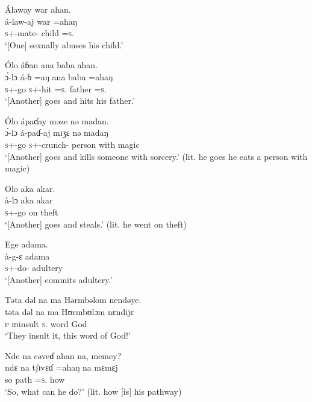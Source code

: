 \ea Álaway  war  ahan.\\
 \gll á-law-aj      war   =ahaŋ\\
 \textsc{s}+{\IFV}-mate{}-{\CL}  child  =\textsc{s}.{\POSS}\\
 \glt ‘[One] sexually abuses his child.’
 \z

\ea  Ólo  áɓan  ana  baba  ahan.\\ 
 \gll \'ɔ-lɔ     á-ɓ    =aŋ   ana  baba  =ahaŋ\\
 \textsc{s}+{\IFV}-go  \textsc{s}+{\IFV}-hit  =\textsc{s}.{\IO}  {\DAT}       father    =\textsc{s}.{\POSS}\\
 \glt ‘[Another] goes and hits his father.’ 
 \z

\ea Ólo  ápaɗay  məze  nə  madan. \\
 \gll \'ɔ{}-lɔ     á-paɗ-aj       mɪʒɛ   nə   madaŋ\\
 \textsc{s}+{\IFV}-go  \textsc{s}+{\IFV}-crunch{}-{\CL}  person  with  magic  \\
 \glt ‘[Another] goes and kills someone with sorcery.’ (lit. he goes he eats a person with magic)
 \z

\ea Olo  aka  akar.\\
 \gll à-lɔ         aka   akar\\
 \textsc{s}+{\PFV}-go   on  theft  \\
 \glt ‘[Another] goes and steals.’ (lit. he went on theft)
 \z

\ea Ege  adama.\\
 \gll à-g-ɛ     adama\\
 \textsc{s}+{\PFV}-do-{\CL}  adultery\\
 \glt ‘[Another] commits adultery.’ 
 \z

\ea Təta  dəl  na  ma  Hərmbəlom  nendəye.\\
 \gll təta   dəl     na   ma   Hʊrmbʊlɔm   nɛndijɛ\\
 \textsc{p}    \textsc{id}insult    \textsc{s}.{\DO}  word  God    {\DEM}\\
 \glt ‘They insult it, this word of God!’
 \z

\ea Nde na  cəveɗ  ahan  na,  memey?\\
 \gll ndɛ  na   tʃɪvɛɗ =ahaŋ     na   mɛmɛj\\
 so  {\PSP}  path  =\textsc{s}.{\POSS}  {\PSP}  how\\
 \glt ‘So, what can he do?’ (lit. how [is] his pathway)
 \z

